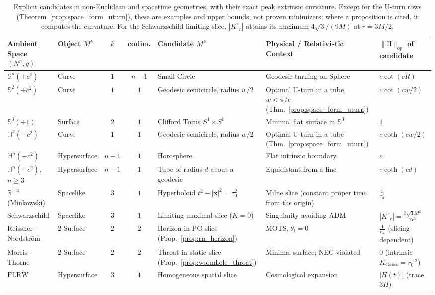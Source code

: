 \documentclass[11pt,reqno]{amsart}
\theoremstyle{definition}
\providecommand{\R}{\mathbb{R}}
\providecommand{\Hyp}{\mathbb{H}}
\providecommand{\Sph}{\mathbb{S}}
\providecommand{\II}{\mathrm{I\!I}}
\newcommand{\op}{\mathrm{op}}
\numberwithin{equation}{section}
\providecommand{\Hyp}{\mathbb{H}}
\providecommand{\Sph}{\mathbb{S}}
\providecommand{\II}{\mathrm{II}}
\providecommand{\R}{\mathbb{R}}
\begin{document}
\begin{table}[htbp]
\centering
\scriptsize
\renewcommand{\arraystretch}{1.3}
\begin{tabularx}{\textwidth}{@{}l l c c >{\raggedright\arraybackslash}X >{\raggedright\arraybackslash}X >{\raggedright\arraybackslash}p{2.3cm}@{}}
\toprule
Ambient Space $(N^n, g)$ & Object $M^k$ & $k$ & codim. & Candidate $M^k$ & Physical / Relativistic Context & $\|\II\|_{\op}$ of candidate \\
\midrule
$\Sph^n(+c^2)$ & Curve & $1$ & $n-1$ & Small Circle & Geodesic turning on Sphere & $c \cot(c R)$ \\
$\Sph^2(+c^2)$ & Curve & $1$ & $1$ & Geodesic semicircle, radius $w/2$ & Optimal U-turn in a tube, $w < \pi/c$ (Thm.~\ref{prop:space_form_uturn}) & $c \cot(cw/2)$ \\
$\Sph^3(+1)$ & Surface & $2$ & $1$ & Clifford Torus $S^1 \times S^1$ & Minimal flat surface in $\Sph^3$ & $1$ \\
$\Hyp^2(-c^2)$ & Curve & $1$ & $1$ & Geodesic semicircle, radius $w/2$ & Optimal U-turn in a tube (Thm.~\ref{prop:space_form_uturn}) & $c \coth(cw/2)$ \\
$\Hyp^n(-c^2)$ & Hypersurface & $n-1$ & $1$ & Horosphere & Flat intrinsic boundary & $c$ \\
$\Hyp^n(-c^2)$, $n \ge 3$ & Hypersurface & $n-1$ & $1$ & Tube of radius $d$ about a geodesic & Equidistant from a line & $c\coth(cd)$ \\
$\R^{1,3}$ (Minkowski) & Spacelike & $3$ & $1$ & Hyperboloid $t^2 - |\mathbf{x}|^2 = \tau_0^2$ & Milne slice (constant proper time from the origin) & $\frac{1}{\tau_0}$ \\
Schwarzschild & Spacelike & $3$ & $1$ & Limiting maximal slice ($K = 0$) \cite{estabrook1973} & Singularity-avoiding ADM & $|K^r{}_r| = \frac{3\sqrt{3} M^2}{2 r^3}$ \\
Reissner--Nordstr\"om & 2-Surface & $2$ & $2$ & Horizon in PG slice (Prop.~\ref{prop:rn_horizon}) & MOTS, $\theta_l = 0$ & $\frac{1}{r_+}$ (slicing-dependent) \\
Morris-Thorne & 2-Surface & $2$ & $2$ & Throat in static slice (Prop.~\ref{prop:wormhole_throat}) & Minimal surface; NEC violated & $0$ (intrinsic $K_{\mathrm{Gauss}} = r_0^{-2}$) \\
$\text{FLRW Cosmology}$ & Hypersurface & $3$ & $1$ & Homogeneous spatial slice & Cosmological expansion & $|H(t)|$ (trace $3H$) \\
\bottomrule
\end{tabularx}
\caption{Explicit candidates in non-Euclidean and spacetime geometries, with their exact peak extrinsic curvature. Except for the U-turn rows (Theorem~\ref{prop:space_form_uturn}), these are examples and upper bounds, not proven minimizers; where a proposition is cited, it computes the curvature. For the Schwarzschild limiting slice, $|K^r{}_r|$ attains its maximum $4\sqrt{3}/(9M)$ at $r = 3M/2$.}
\label{tab:noneuclidean_master}
\end{table}
\end{document}
